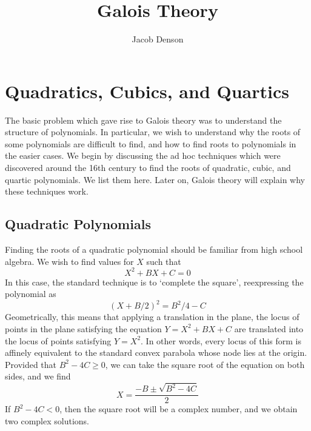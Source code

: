 

\title{Galois Theory}
\author{Jacob Denson}



\maketitle
\tableofcontents

\chapter{Quadratics, Cubics, and Quartics}


The basic problem which gave rise to Galois theory was to understand the structure of polynomials. In particular, we wish to understand why the roots of some polynomials are difficult to find, and how to find roots to polynomials in the easier cases. We begin by discussing the ad hoc techniques which were discovered around the 16th century to find the roots of quadratic, cubic, and quartic polynomials. We list them here. Later on, Galois theory will explain why these techniques work.

\section{Quadratic Polynomials}

Finding the roots of a quadratic polynomial should be familiar from high school algebra. We wish to find values for $X$ such that
%
\[ X^2 + BX + C  = 0 \]
%
In this case, the standard technique is to `complete the square', reexpressing the polynomial as
%
\[ \left( X + B/2 \right)^2 = B^2/4 - C \]
%
Geometrically, this means that applying a translation in the plane, the locus of points in the plane satisfying the equation $Y = X^2 + BX + C$ are translated into the locus of points satisfying $Y = X^2$. In other words, every locus of this form is affinely equivalent to the standard convex parabola whose node lies at the origin. Provided that $B^2 - 4C \geq 0$, we can take the square root of the equation on both sides, and we find
%
\[ X = \frac{-B \pm \sqrt{B^2 - 4C}}{2} \]
%
If $B^2 - 4C < 0$, then the square root will be a complex number, and we obtain two complex solutions.

